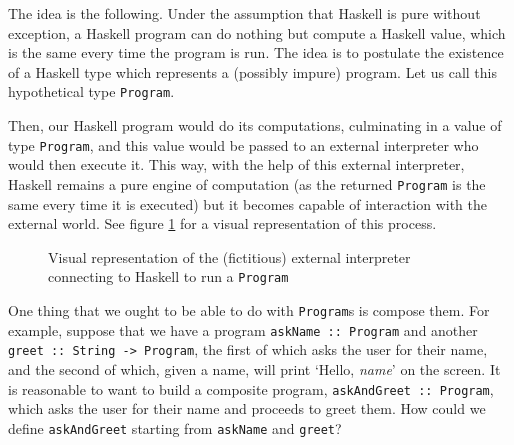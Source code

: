 \documentclass[11	pt]{article}
\theoremstyle{nonumberplain}
\newcommand*\lsin{\lstinline}
\begin{document}
The idea is the following. Under the assumption that Haskell is pure without exception, a Haskell program can do nothing but compute a Haskell value, which is the same every time the program is run. The idea is to postulate the existence of a Haskell type which represents a (possibly impure) program. Let us call this hypothetical type \lsin|Program|.

Then, our Haskell program would do its computations, culminating in a value of type \lsin|Program|, and this value would be passed to an external interpreter who would then execute it. This way, with the help of this external interpreter, Haskell remains a pure engine of computation (as the returned \lsin|Program| is the same every time it is executed) but it becomes capable of interaction with the external world. See figure \ref{fig:program} for a visual representation of this process.

\begin{figure}
\centering
{}
\caption{Visual representation of the (fictitious) external interpreter connecting to Haskell to run a \lsin|Program|}\label{fig:program}
\end{figure}

One thing that we ought to be able to do with \lsin|Program|s is compose them. For example, suppose that we have a program \lsin|askName :: Program| and another \lsin|greet :: String -> Program|, the first of which asks the user for their name, and the second of which, given a name, will print `Hello, \textit{name}' on the screen. It is reasonable to want to build a composite program, \lsin|askAndGreet :: Program|, which asks the user for their name and proceeds to greet them. How could we define \lsin|askAndGreet| starting from \lsin|askName| and \lsin|greet|?
\end{document}
